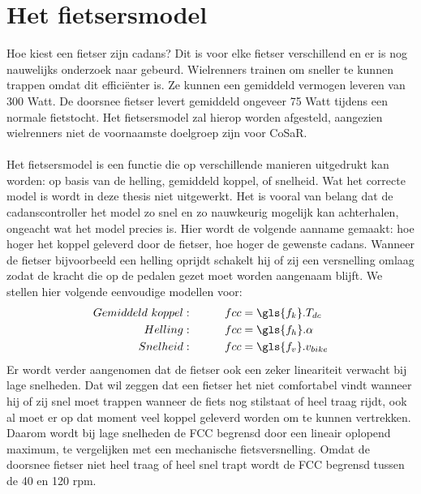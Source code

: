 \section{Het fietsersmodel}
Hoe kiest een fietser zijn cadans? Dit is voor elke fietser verschillend en er is nog nauwelijks onderzoek naar gebeurd. Wielrenners trainen om sneller te kunnen trappen omdat dit efficiënter is. Ze kunnen een gemiddeld vermogen leveren van 300 Watt. De doorsnee fietser levert gemiddeld ongeveer 75 Watt tijdens een normale fietstocht. Het fietsersmodel zal hierop worden afgesteld, aangezien wielrenners niet de voornaamste doelgroep zijn voor CoSaR.
\\\\
Het fietsersmodel is een functie die op verschillende manieren uitgedrukt kan worden: op basis van de helling, gemiddeld koppel, of snelheid. Wat het correcte model is wordt in deze thesis niet uitgewerkt. Het is vooral van belang dat de cadanscontroller het model zo snel en zo nauwkeurig mogelijk kan achterhalen, ongeacht wat het model precies is. Hier wordt de volgende aanname gemaakt: hoe hoger het koppel geleverd door de fietser, hoe hoger de gewenste cadans. Wanneer de fietser bijvoorbeeld een helling oprijdt schakelt hij of zij een versnelling omlaag zodat de kracht die op de pedalen gezet moet worden aangenaam blijft. We stellen hier volgende eenvoudige modellen voor:
\begin{align*}
Gemiddeld \ koppel:\tab fcc &= \gls{f_k} . T_{dc}\\
Helling:\tab fcc &= \gls{f_h} . \alpha\\
Snelheid:\tab fcc &= \gls{f_v} . v_{bike}
\end{align*}
Er wordt verder aangenomen dat de fietser ook een zeker lineariteit verwacht bij lage snelheden. Dat wil zeggen dat een fietser het niet comfortabel vindt wanneer hij of zij snel moet trappen wanneer de fiets nog stilstaat of heel traag rijdt, ook al moet er op dat moment veel koppel geleverd worden om te kunnen vertrekken. Daarom wordt bij lage snelheden de FCC begrensd door een lineair oplopend maximum, te vergelijken met een mechanische fietsversnelling. Omdat de doorsnee fietser niet heel traag of heel snel trapt wordt de FCC begrensd tussen de 40 en 120 rpm.
